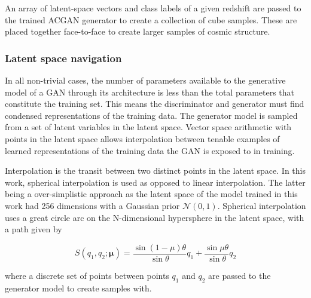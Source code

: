 \documentclass[twocolumn]{article}
\numberwithin{equation}{section}
\begin{document}

An array of latent-space vectors and class labels of a given redshift are passed to the trained ACGAN generator to create a
collection of cube samples. These are placed together face-to-face to create larger samples of cosmic structure. 


\subsubsection{Latent space navigation}
In all non-trivial cases, the number of parameters available to the generative model of a GAN through its architecture is less than the total parameters that constitute the training set. This means the discriminator and generator must find 
condensed representations of the training data. The generator model is sampled from a set of latent variables in the latent
space. Vector space arithmetic with points in the latent space allows interpolation between tenable examples of learned 
representations of the training data the GAN is exposed to in training. 

Interpolation is the transit between two distinct points in the latent space. In this work, spherical interpolation is used
as opposed to linear interpolation. The latter being a over-simplistic approach as the latent space of the model trained in this work had 256 dimensions with a Gaussian prior $\mathcal{N}(0,1)$. Spherical interpolation uses a great circle arc on the N-dimensional hypersphere in the latent space, with a path given by %

\begin{equation}
    S(q_1, q_2; \mathbf{\mu}) = \frac{\sin (1 - \mu)\theta}{\sin \theta}q_1 + \frac{\sin \mu\theta}{\sin \theta}q_2
\end{equation}

where a discrete set of points between points $q_1$ and $q_2$ are passed to the generator model to create samples with. 


\end{document}
